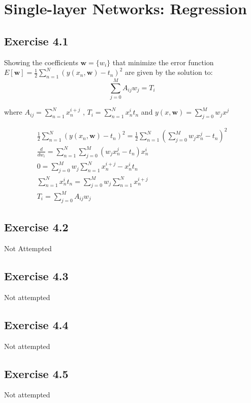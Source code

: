 \section{Single-layer Networks: Regression}

\subsection{Exercise 4.1}
Showing the coefficients $\mathbf{w} = \{w_i\}$ that minimize the error function $E[\mathbf{w}] = \frac{1}{2} \sum_{n=1}^{N} (y(x_n,\mathbf{w}) - t_n)^2 $ are given by the solution to:
\begin{equation}
  \sum_{j=0}^{M}A_{ij}w_j = T_i
\end{equation}

where $A_{ij} = \sum_{n=1}^{N}x_n^{i+j}$ , $T_i = \sum_{n=1}^{N}x_n^it_n$ and $y(x,\mathbf{w}) = \sum_{j=0}^{M} w_j x^j$

\begin{gather}
  \frac{1}{2} \sum_{n=1}^{N} (y(x_n,\mathbf{w}) - t_n)^2 =  \frac{1}{2} \sum_{n=1}^{N} (\sum_{j=0}^{M} w_j x_n^j - t_n)^2 \\
  \frac{d}{dw_i} = \sum_{n=1}^{N} \sum_{j=0}^{M}( w_j x_n^j - t_n)x_n^i \\
  0 =  \sum_{j=0}^{M} w_j \sum_{n=1}^{N} x_n^{i+j} - x_n^it_n \\
  \sum_{n=1}^{N}x_n^it_n = \sum_{j=0}^{M} w_j \sum_{n=1}^{N} x_n^{i+j} \\
  T_i = \sum_{j=0}^{M}A_{ij}w_j
\end{gather}

\subsection{Exercise 4.2}
Not Attempted



\subsection{Exercise 4.3}
Not attempted


\subsection{Exercise 4.4}
Not attempted

\subsection{Exercise 4.5}
Not attempted

